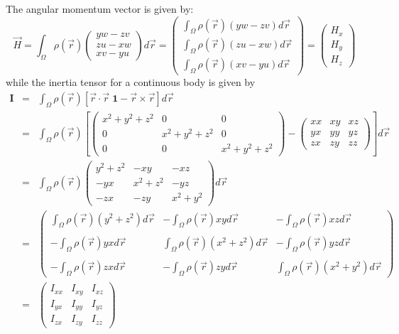 The angular momentum vector is given by:
\begin{equation}
\vec H 
= \int_\Omega \rho(\vec r) \left( 
\begin{array}{c} 
yw-zv \\ zu-xw \\ xv-yu 
\end{array} \right) d\vec r
= 
\left(\begin{array}{c} 
\int_\Omega \rho(\vec r) (yw-zv) d\vec r\\
\int_\Omega \rho(\vec r) (zu-xw) d\vec r\\
\int_\Omega \rho(\vec r) (xv-yu) d\vec r
\end{array} \right)
= 
\left( 
\begin{array}{c} 
H_x \\ H_y \\ H_z
\end{array} \right)
\end{equation}
while the inertia tensor for a continuous body is given 
by
\begin{eqnarray}
\bm I
&=&\int_\Omega \rho(\vec r) [\vec r\cdot\vec r \; \bm 1 - \vec r \times \vec r  ] d\vec r \\
&=&\int_\Omega \rho(\vec r) 
\left[
\left(
\begin{array}{ccc}
x^2+y^2+z^2 & 0 & 0 \\
0 & x^2+y^2+z^2 & 0 \\
0 & 0 & x^2+y^2+z^2
\end{array}
\right)
- 
\left(
\begin{array}{ccc}
xx & xy & xz \\
yx & yy & yz \\
zx & zy & zz 
\end{array}
\right)
\right] 
d\vec r \\
&=&\int_\Omega \rho(\vec r) 
\left(
\begin{array}{ccc}
y^2+z^2 & -xy & -xz \\
-yx & x^2+z^2 & -yz \\
-zx & -zy & x^2+y^2 
\end{array}
\right)
d\vec r \\
&=&
\left(
\begin{array}{ccc}
\int_\Omega \rho(\vec r) (y^2+z^2) d\vec r & 
-\int_\Omega \rho(\vec r) xy d\vec r & 
-\int_\Omega \rho(\vec r) xz d\vec r \\\\
-\int_\Omega \rho(\vec r) yx d\vec r & 
\int_\Omega \rho(\vec r) (x^2+z^2) d\vec r & 
-\int_\Omega \rho(\vec r) yz d\vec r \\\\
-\int_\Omega \rho(\vec r) zx d\vec r & 
-\int_\Omega \rho(\vec r) zy d\vec r & 
\int_\Omega \rho(\vec r) (x^2+y^2) d\vec r 
\end{array}
\right)\\
&=&
\left(
\begin{array}{ccc}
I_{xx} & I_{xy} & I_{xz} \\
I_{yx} & I_{yy} & I_{yz} \\
I_{zx} & I_{zy} & I_{zz} 
\end{array}
\right)
\end{eqnarray}


